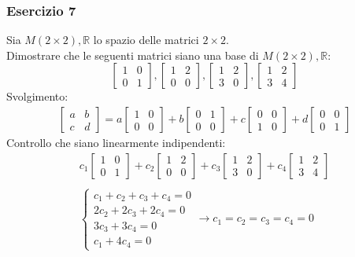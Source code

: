 \documentclass[italian]{article}
\newcommand{\ins}[1]{\text{$\mathbb{#1}$}}
\begin{document}
\subsubsection{Esercizio 7}
Sia $M(2\times 2), \ins{R}$ lo spazio delle matrici $2\times 2$.\\[2mm]
Dimostrare che le seguenti matrici siano una base di $M(2\times 2), \ins{R}$:
\[
	\begin{bmatrix}
		1 & 0 \\ 0 & 1
	\end{bmatrix}
	,
	\begin{bmatrix}
		1 & 2 \\ 0 & 0
	\end{bmatrix}
	,
	\begin{bmatrix}
		1 & 2 \\ 3 & 0
	\end{bmatrix}
	,
	\begin{bmatrix}
		1 & 2 \\ 3 & 4
	\end{bmatrix}
\]
Svolgimento:
\begin{gather*}
	\begin{bmatrix}
		a & b \\ c & d
	\end{bmatrix}
	=
	a
	\begin{bmatrix}
		1 & 0 \\ 0 & 0
	\end{bmatrix}
	+
	b
	\begin{bmatrix}
		0 & 1 \\ 0 & 0
	\end{bmatrix}
	+
	c
	\begin{bmatrix}
		0 & 0 \\ 1 & 0
	\end{bmatrix}
	+
	d
	\begin{bmatrix}
		0 & 0 \\ 0 & 1
	\end{bmatrix}	
\end{gather*}
Controllo che siano linearmente indipendenti:
\begin{gather*}
	c_1
	\begin{bmatrix}
		1 & 0 \\ 0 & 1
	\end{bmatrix}
	+
	c_2
	\begin{bmatrix}
		1 & 2 \\ 0 & 0
	\end{bmatrix}
	+
	c_3
	\begin{bmatrix}
		1 & 2 \\ 3 & 0
	\end{bmatrix}
	+
	c_4
	\begin{bmatrix}
		1 & 2 \\ 3 & 4
	\end{bmatrix} \\\\
	\begin{cases*}
		c_1 + c_2 + c_3 + c_4 = 0 \\
		2c_2 + 2c_3 + 2c_4 = 0 \\
		3c_3 + 3c_4 = 0 \\
		c_1 + 4c_4 = 0
	\end{cases*}
	\to c_1 = c_2 = c_3 = c_4 = 0
\end{gather*}
\end{document}
